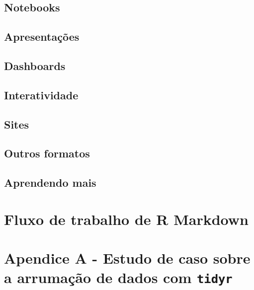 \documentclass[
]{latex/krantz}
\theoremstyle{definition}
\theoremstyle{definition}
\theoremstyle{definition}
\theoremstyle{definition}
\theoremstyle{remark}
\begin{document}
\hypertarget{notebooks}{%
\section{Notebooks}\label{notebooks}}

\hypertarget{apresentauxe7uxf5es}{%
\section{Apresentações}\label{apresentauxe7uxf5es}}

\hypertarget{dashboards}{%
\section{Dashboards}\label{dashboards}}

\hypertarget{interatividade}{%
\section{Interatividade}\label{interatividade}}

\hypertarget{sites}{%
\section{Sites}\label{sites}}

\hypertarget{outros-formatos}{%
\section{Outros formatos}\label{outros-formatos}}

\hypertarget{aprendendo-mais-3}{%
\section{Aprendendo mais}\label{aprendendo-mais-3}}

\hypertarget{fluxo-de-trabalho-de-r-markdown}{%
\chapter{Fluxo de trabalho de R Markdown}\label{fluxo-de-trabalho-de-r-markdown}}

\hypertarget{appendix-apuxe9ndices}{%
\appendix {}}


\hypertarget{apendice-a---estudo-de-caso-sobre-a-arrumauxe7uxe3o-de-dados-com-tidyr}{%
\chapter{\texorpdfstring{Apendice A - Estudo de caso sobre a arrumação de dados com \texttt{tidyr}}{Apendice A - Estudo de caso sobre a arrumação de dados com tidyr}}\label{apendice-a---estudo-de-caso-sobre-a-arrumauxe7uxe3o-de-dados-com-tidyr}}
\end{document}
